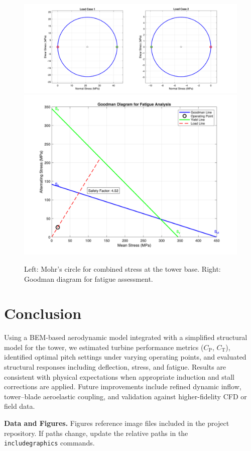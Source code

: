 \documentclass[11pt]{article}
\begin{document}
\begin{figure}[h]
  \centering
  \includegraphics[width=0.48\linewidth]{../../Mohr_Circle_Analysis.png}\hfill
  \includegraphics[width=0.48\linewidth]{../../Goodman_Diagram_Analysis.png}
  \caption{Left: Mohr's circle for combined stress at the tower base. Right: Goodman diagram for fatigue assessment.}
  \label{fig:tower_mohr_goodman}
\end{figure}

\section{Conclusion}
Using a BEM-based aerodynamic model integrated with a simplified structural model for the tower, we estimated turbine performance metrics (\(C_\mathrm{P}\), \(C_\mathrm{T}\)), identified optimal pitch settings under varying operating points, and evaluated structural responses including deflection, stress, and fatigue. Results are consistent with physical expectations when appropriate induction and stall corrections are applied. Future improvements include refined dynamic inflow, tower--blade aeroelastic coupling, and validation against higher-fidelity CFD or field data.

\vspace{1em}
\noindent\textbf{Data and Figures.} Figures reference image files included in the project repository. If paths change, update the relative paths in the \texttt{\\includegraphics} commands.
\end{document}
